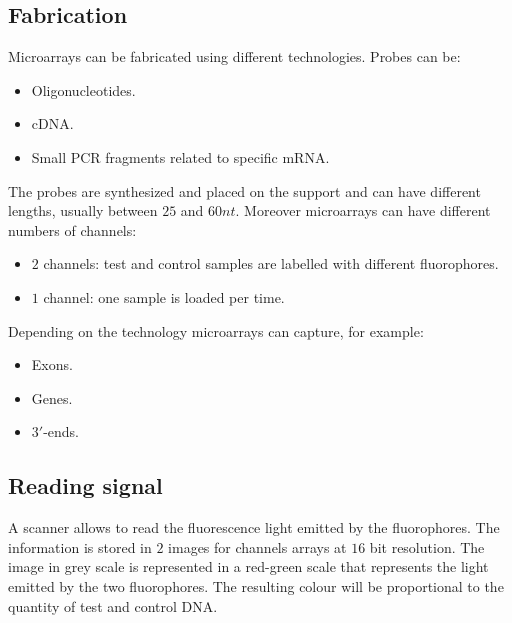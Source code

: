 	\subsection{Fabrication}
	Microarrays can be fabricated using different technologies.
	Probes can be:

	\begin{multicols}{3}
		\begin{itemize}
			\item Oligonucleotides.
			\item cDNA.
			\item Small PCR fragments related to specific mRNA.
		\end{itemize}
	\end{multicols}

	The probes are synthesized and placed on the support and can have different lengths, usually between $25$ and $60nt$.
	Moreover microarrays can have different numbers of channels:

	\begin{multicols}{2}
		\begin{itemize}
			\item $2$ channels: test and control samples are labelled with different fluorophores.
			\item $1$ channel: one sample is loaded per time.
		\end{itemize}
	\end{multicols}

	Depending on the technology microarrays can capture, for example:

	\begin{multicols}{3}
		\begin{itemize}
			\item Exons.
			\item Genes.
			\item $3'$-ends.
		\end{itemize}
	\end{multicols}

	\subsection{Reading signal}
	A scanner allows to read the fluorescence light emitted by the fluorophores.
	The information is stored in $2$ images for channels arrays at $16$ bit resolution.
	The image in grey scale is represented in a red-green scale that represents the light emitted by the two fluorophores.
	The resulting colour will be proportional to the quantity of test and control DNA.

